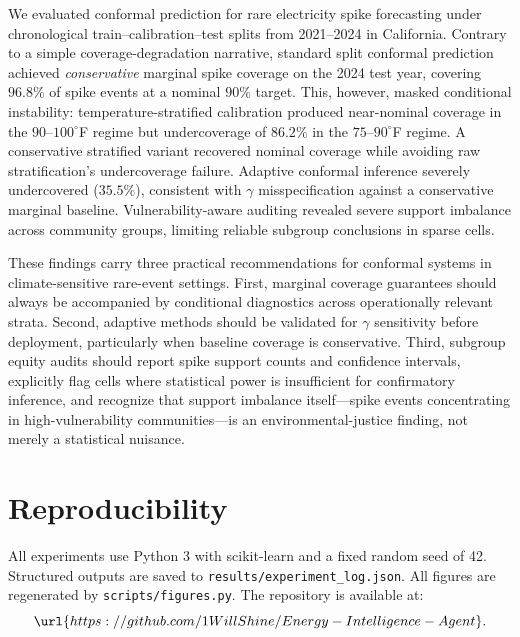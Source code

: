 \documentclass{article}
\begin{document}
We evaluated conformal prediction for rare electricity spike forecasting under
chronological train--calibration--test splits from 2021--2024 in California.
Contrary to a simple coverage-degradation narrative, standard split conformal
prediction achieved \emph{conservative} marginal spike coverage on the 2024
test year, covering $96.8\%$ of spike events at a nominal $90\%$ target.
This, however, masked conditional instability: temperature-stratified
calibration produced near-nominal coverage in the $90$--$100^{\circ}$F regime
but undercoverage of $86.2\%$ in the $75$--$90^{\circ}$F regime. A conservative
stratified variant recovered nominal coverage while avoiding raw stratification's
undercoverage failure. Adaptive conformal inference severely undercovered
($35.5\%$), consistent with $\gamma$ misspecification against a conservative
marginal baseline. Vulnerability-aware auditing revealed severe support
imbalance across community groups, limiting reliable subgroup conclusions in
sparse cells.

These findings carry three practical recommendations for conformal systems in
climate-sensitive rare-event settings. First, marginal coverage guarantees
should always be accompanied by conditional diagnostics across operationally
relevant strata. Second, adaptive methods should be validated for $\gamma$
sensitivity before deployment, particularly when baseline coverage is
conservative. Third, subgroup equity audits should report spike support
counts and confidence intervals, explicitly flag cells where statistical power
is insufficient for confirmatory inference, and recognize that support
imbalance itself---spike events concentrating in high-vulnerability
communities---is an environmental-justice finding, not merely a statistical
nuisance.

\section*{Reproducibility}

All experiments use Python 3 with scikit-learn and a fixed random seed of 42.
Structured outputs are saved to \texttt{results/experiment\_log.json}.
All figures are regenerated by \texttt{scripts/figures.py}. The repository
is available at:
\[
\url{https://github.com/1WillShine/Energy-Intelligence-Agent}.
\]

\appendix
\end{document}
